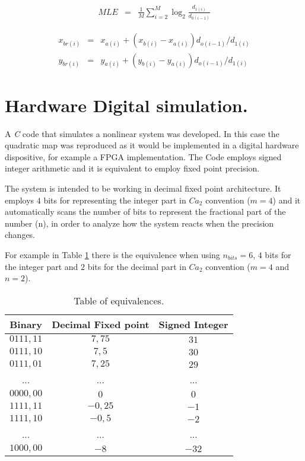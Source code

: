 \documentclass[conference]{IEEEtran}
\begin{document}
\begin{eqnarray}\label{eq:Lyapunov}
    MLE &=& \frac{1}{M} \sum_{i=2}^{M} \log_2{\frac{d_{1(i)}}{d_{0(i-1)}}}
\end{eqnarray}


\begin{eqnarray}\label{eq:reubicacion}
    x_{br(i)}&=& x_{a(i)}+(x_{b(i)}-x_{a(i)})d_{o(i-1)}/d_{1(i)} \nonumber\\
    y_{br(i)}&=& y_{a(i)}+(y_{b(i)}-y_{a(i)})d_{o(i-1)}/d_{1(i)}
\end{eqnarray}


\section{Hardware Digital simulation.} \label{sec:repre}

A \textit{C} code that simulates a nonlinear system was developed.
In this case the quadratic map was reproduced as it would be
implemented in a digital hardware dispositive, for example a FPGA
implementation. The Code employs signed integer arithmetic and it
is equivalent to employ fixed point precision.


The system is intended to be working in decimal fixed point
architecture. It employs $4$ bits for representing the integer
part in $Ca_2$ convention ($m=4$) and it automatically scans the
number of bits to represent the fractional part of the number (n),
in order to analyze how the system reacts when the precision
changes.


For example in Table \ref{tab:tabla} there is the equivalence when
using $n_{bits} =6$, $4$ bits for the integer part and $2$ bits
for the decimal part in $Ca_2$ convention ($m=4$ and  $n=2$).

\begin{table}[h]
  \caption{Table of equivalences.}\label{tab:tabla}
  \vspace{2mm}
  \centering
  \begin{tabular}{ c c c }
  Binary  & Decimal Fixed point & Signed Integer  \\
   \hline
  $0111,11$ & $7,75$ & $31$ \\
  $0111,10$ & $7,5$ & $30$ \\
  $0111,01$ & $7,25$ & $29$ \\
   ... & ... &  ...\\
  $0000,00$ & $0$ & $0$  \\
  $1111,11$ & $-0,25$ & $-1$ \\
  $1111,10$ & $-0,5$ & $-2$  \\
   ... & ... & ... \\
    $1000,00$ &  $-8$ & $-32$  \\
    \end{tabular}
\end{table}
\end{document}
